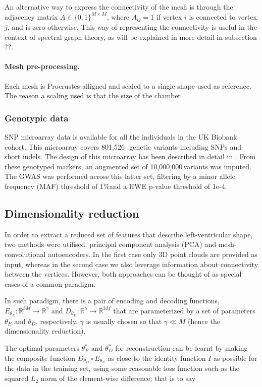 \documentclass[twocolumn]{llncs}
\newcommand{\NCALLS}{801,526\,} %
\newcommand{\MAFTHR}{1\%} %
\newcommand{\NIMP}{10,000,000\,} %
\newcommand{\HWEPVAL}{1e-4} %
\begin{document}
An alternative way to express the connectivity of the mesh is through the adjacency matrix $A\in\{0,1\}^{M\times M}$, where $A_{ij}=1$ if vertex $i$ is connected to vertex $j$, and is zero otherwise. This way of representing the connectivity is useful in the context of spectral graph theory, as will be explained in more detail in subsection ??.

\paragraph{Mesh pre-processing.} Each mesh is Procrustes-alligned and scaled to a single shape used as reference. The reason a scaling used is that the size of the chamber


\subsubsection{Genotypic data}
SNP microarray data is available for all the individuals in the UK Biobank cohort. This microarray covers \NCALLS\, genetic variants including SNPs and short indels. The design of this microarray has been described in detail in \cite{ref_ukbb_genetics}. From these genotyped markers, an augmented set of \NIMP variants was imputed. The GWAS was performed across this latter set, filtering by a minor allele frequency (MAF) threshold of \MAFTHR and a HWE p-value threshold of \HWEPVAL.


\subsection{Dimensionality reduction}
In order to extract a reduced set of features that describe left-ventricular shape, two methods were utilised: principal component analysis (PCA) and mesh-convolutional autoencoders. In the first case only 3D point clouds are provided as input, whereas in the second case we also leverage information about connectivity between the vertices. However, both approaches can be thought of as special cases of a common paradigm.

In such paradigm, there is a pair of encoding and decoding functions, $E_{\theta_E}:\mathbb{R}^{3M}\rightarrow\mathbb{R}^{\gamma}$ and $D_{\theta_D}:\mathbb{R}^{\gamma}\rightarrow\mathbb{R}^{3M}$ that are parameterized by a set of parameters $\theta_E$ and $\theta_D$, respectively. $\gamma$ is usually chosen so that $\gamma\ll M$ (hence the dimensionality reduction). 

The optimal parameters $\theta_E^*$ and $\theta_D^*$ for reconstruction can be learnt by making the composite function $D_{\theta_D} \circ E_{\theta_E}$ as close to the identity function $I$ as possible for the data in the training set, using some reasonable loss function such as the squared $L_2$ norm of the element-wise difference; that is to say
\end{document}
